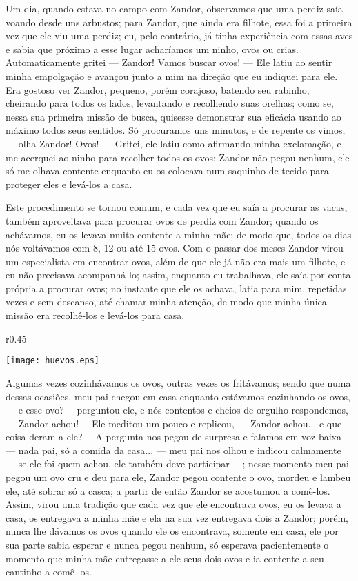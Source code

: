 Um dia, quando estava no campo com Zandor, observamos que uma perdiz saía voando desde uns arbustos; para Zandor, que ainda era filhote, essa foi a primeira vez que ele viu uma perdiz; eu, pelo contrário, já tinha experiência com essas aves e sabia que próximo a esse lugar acharíamos um ninho, ovos ou crias. 
Automaticamente gritei --- Zandor! Vamos buscar ovos! --- Ele latiu ao sentir minha empolgação e avançou junto a mim na direção que eu indiquei para ele. 
Era gostoso ver Zandor, pequeno, porém corajoso, batendo seu rabinho, cheirando para todos os lados, levantando e recolhendo suas orelhas; como se, nessa sua primeira missão de busca, quisesse demonstrar sua eficácia usando ao máximo todos seus sentidos. 
Só procuramos uns minutos, e de repente os vimos, --- olha Zandor! Ovos! --- Gritei, ele latiu como afirmando minha exclamação, e me acerquei ao ninho para recolher todos os ovos; Zandor não pegou nenhum, ele só me olhava contente enquanto eu os colocava num saquinho de tecido para proteger eles e levá-los a casa. 


Este procedimento se tornou comum, e cada vez que eu saía a procurar as vacas, também aproveitava para procurar ovos de perdiz com Zandor; quando os achávamos, eu os levava muito contente a minha mãe; de modo que, todos os dias nós voltávamos com 8, 12 ou até 15 ovos. 
Com o passar dos meses Zandor virou um especialista em encontrar ovos, além de que ele já não era mais um filhote, e eu não precisava acompanhá-lo; assim, enquanto eu trabalhava, ele saía por conta própria a procurar ovos; no instante que ele os achava, latia para mim, repetidas vezes e sem descanso, até chamar minha atenção, de modo que minha única missão era recolhê-los e levá-los para casa.
\begin{wrapfigure}{r}{0.45\textwidth}
  \begin{center}
  \vspace{-20pt}
    \texttt{[image: huevos.eps]}
  \end{center}
  \vspace{-20pt}
\end{wrapfigure}
Algumas vezes cozinhávamos os ovos, outras vezes os fritávamos; sendo que numa dessas ocasiões, meu pai chegou em casa enquanto estávamos cozinhando os ovos,--- e esse ovo?--- perguntou ele, e nós contentos e cheios de orgulho respondemos,--- Zandor achou!---
Ele meditou um pouco e replicou, --- Zandor achou... e que coisa deram a ele?--- A pergunta nos pegou de surpresa e falamos em voz baixa --- nada pai, só a comida da casa... --- meu pai nos olhou e indicou calmamente --- se ele foi quem achou, ele também deve participar ---; 
nesse momento meu pai pegou um ovo cru e deu para ele, Zandor pegou contente o ovo, mordeu e lambeu ele, até sobrar só a casca; a partir de então Zandor se acostumou a comê-los. Assim, virou uma tradição que cada vez que ele encontrava ovos, eu os levava a casa, os entregava a minha mãe e ela na sua vez entregava dois a Zandor; porém, nunca lhe dávamos os ovos quando ele os encontrava, somente em casa, ele por sua parte sabia esperar e nunca pegou nenhum, só esperava pacientemente o momento que minha mãe entregasse a ele seus dois ovos e ia contente a seu cantinho a comê-los.


